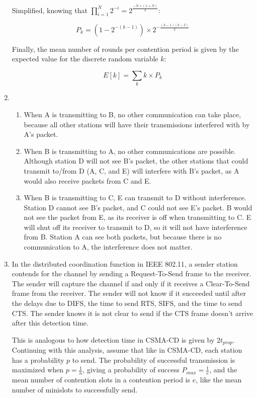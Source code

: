 \documentclass{article}
\begin{document}
\begin{enumerate}
Simplified, knowing that $ \prod_{i=1}^{N}2^{-i} = 2^{\frac{-N \times (1 + N)}{2}}$:

$$ P_k = (1-2^{-(k-1)}) \times 2^{-\frac{(k-1)(k-2)}{2}} $$

Finally, the mean number of rounds per contention period is given by the expected value for the discrete random variable $ k $:

$$ E[k] = \sum_{k}k \times P_k $$

\item
\begin{enumerate}

\item When A is transmitting to B, no other communication can take place, because all other stations will have their transmissions interfered with by A's packet.

\item When B is transmitting to A, no other communications are possible. Although station D will not see B's packet, the other stations that could transmit to/from D (A, C, and E) will interfere with B's packet, as A would also receive packets from C and E.

\item When B is transmitting to C, E can transmit to D without interference. Station D cannot see B's packet, and C could not see E's packet. B would not see the packet from E, as its receiver is off when transmitting to C. E will shut off its receiver to transmit to D, so it will not have interference from B. Station A can see both packets, but because there is no communication to A, the interference does not matter.

\end{enumerate}

\item In the distributed coordination function in IEEE 802.11, a sender station contends for the channel by sending a Request-To-Send frame to the receiver. The sender will capture the channel if and only if it receives a Clear-To-Send frame from the receiver. The sender will not know if it succeeded until after the delays due to DIFS, the time to send RTS, SIFS, and the time to send CTS. The sender knows it is not clear to send if the CTS frame doesn't arrive after this detection time.

This is analogous to how detection time in CSMA-CD is given by $ 2t_{prop} $. Continuing with this analysis, assume that like in CSMA-CD, each station has a probability $ p $ to send. The probability of successful transmission is maximized when $ p = \frac{1}{n} $, giving a probability of success $ P_{max} = \frac{1}{e}$, and the mean number of contention slots in a contention period is $ e $, like the mean number of minislots to successfully send.


\end{enumerate}
\end{document}
